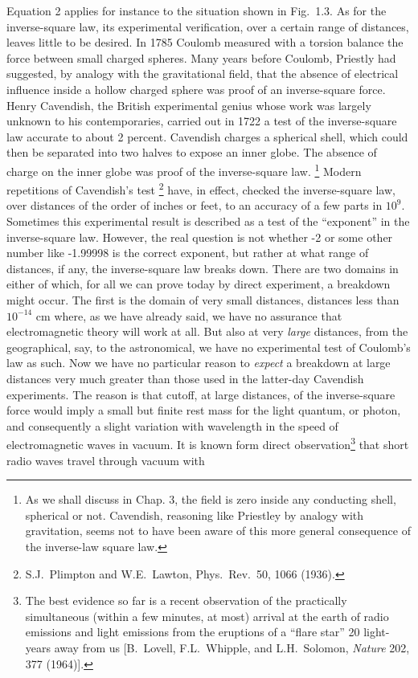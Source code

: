 \noindent Equation 2 applies for
instance to the situation shown in Fig.~1.3. As for the
inverse-square law, its experimental verification, over a certain
range of distances, leaves little to be desired. In 1785 Coulomb
measured with a torsion balance the force between small charged
spheres. Many years before Coulomb, Priestly had suggested, by
analogy with the gravitational field, that the absence of electrical
influence inside a hollow charged sphere was proof of an
inverse-square force. Henry Cavendish, the British experimental
genius whose work was largely unknown to his contemporaries, carried
out in 1722 a test of the inverse-square law accurate to about 2
percent. Cavendish charges a spherical shell, which could then be
separated into two halves to expose an inner globe. The absence of
charge on the inner globe was proof of the inverse-square law.
\footnote {As we shall discuss in Chap. 3, the field is zero inside
any conducting shell, spherical or not. Cavendish, reasoning like
Priestley by analogy with gravitation, seems not to have been aware
of this more general consequence of the inverse-law square
law.} Modern repetitions of Cavendish's test \footnote{S.J.~Plimpton
and W.E.~Lawton, Phys.~Rev.~50, 1066 (1936).} have, in effect, checked
the inverse-square law, over distances of the order of inches or
feet, to an accuracy of a few parts in $10^{9}$.      Sometimes this
experimental result is described as a test of the ``exponent'' in the
inverse-square law. However, the real question is not whether -2 or
some other number like -1.99998 is the correct exponent, but rather
at what range of distances, if any, the inverse-square law breaks
down. There are two domains in either of which, for all we can prove
today by direct experiment, a breakdown might occur. The first is the
domain of very small distances, distances less than $10^{-14}$ cm
where, as we have already said, we have no assurance that
electromagnetic theory will work at all. But also at very
\emph{large} distances, from the geographical, say, to the
astronomical, we have no experimental test of Coulomb's law as such.
Now we have no particular reason to \emph{expect} a breakdown at
large distances very much greater than those used in the latter-day
Cavendish experiments. The reason is that cutoff, at large distances,
of the inverse-square force would imply a small but finite rest mass
for the light quantum, or photon, and consequently a slight variation
with wavelength in the speed of electromagnetic waves in vacuum. It
is known form direct observation\footnote{The best evidence so far
is a recent observation of the practically simultaneous (within a few
minutes, at most) arrival at the earth of radio emissions and light
emissions from the eruptions of a ``flare star'' 20 light-years away
from us [B.~Lovell, F.L.~Whipple, and L.H.~Solomon, \emph{Nature}
202, 377 (1964)].}  that short radio waves travel through vacuum with
